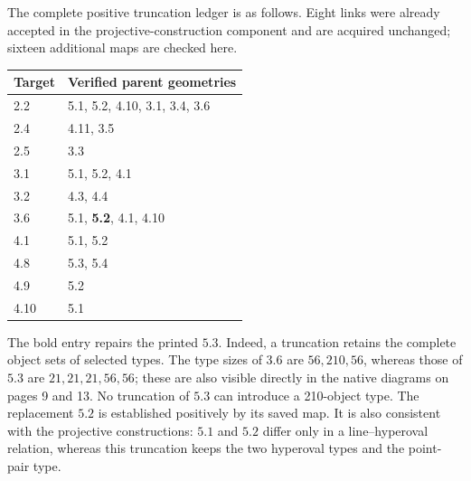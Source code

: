 \documentclass[11pt]{article}
\begin{document}
The complete positive truncation ledger is as follows. Eight links
were already accepted in the projective-construction component and are
acquired unchanged; sixteen additional maps are checked here.
\begin{center}\small
\begin{tabular}{ll}\toprule
Target & Verified parent geometries\\\midrule
2.2 &5.1, 5.2, 4.10, 3.1, 3.4, 3.6\\
2.4 &4.11, 3.5\\
2.5 &3.3\\
3.1 &5.1, 5.2, 4.1\\
3.2 &4.3, 4.4\\
3.6 &5.1, \textbf{5.2}, 4.1, 4.10\\
4.1 &5.1, 5.2\\
4.8 &5.3, 5.4\\
4.9 &5.2\\
4.10&5.1\\\bottomrule
\end{tabular}
\end{center}
The bold entry repairs the printed $5.3$. Indeed, a truncation retains
the complete object sets of selected types. The type sizes of $3.6$
are $56,210,56$, whereas those of $5.3$ are $21,21,21,56,56$; these
are also visible directly in the native diagrams on pages 9 and 13.
No truncation of $5.3$ can introduce a 210-object type. The replacement
$5.2$ is established positively by its saved map. It is also consistent
with the projective constructions: $5.1$ and $5.2$ differ only in a
line--hyperoval relation, whereas this truncation keeps the two
hyperoval types and the point-pair type.
\end{document}
